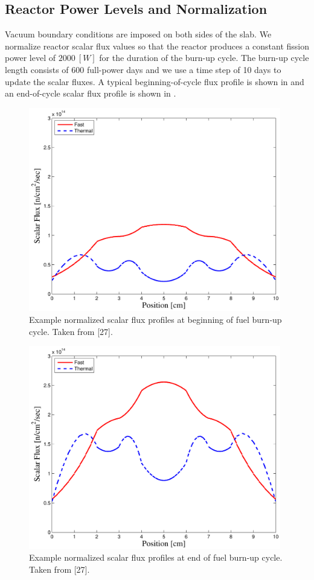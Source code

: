 \subsection{Reactor Power Levels and Normalization}

Vacuum boundary conditions are imposed on both sides of the slab.  
We normalize reactor scalar flux values so that the reactor produces a constant fission power level of $2000~[W]$ for the duration of the burn-up cycle.
The burn-up cycle length consists of 600 full-power days and we use a time step of 10 days to update the scalar fluxes.
A typical beginning-of-cycle flux profile is shown in  and an end-of-cycle scalar flux profile is shown in .  
\begin{figure}[!htp]
\centering
\includegraphics[width=11cm]{chapter5_depletion/P1_Lobatto_full_80_cells_t_steps60_End_600_Power_2000__BOC_Flux.pdf}
\caption{Example normalized scalar flux profiles at beginning of fuel burn-up cycle.  Taken from [27].}
\label{fig:ex_boc_cycle}
\end{figure}
%
\begin{figure}[!htp]
\centering
\includegraphics[width=11cm]{chapter5_depletion/P1_Lobatto_full_80_cells_t_steps60_End_600_Power_2000__EOC_Flux.pdf}
\caption{Example normalized scalar flux profiles at end of fuel burn-up cycle.  Taken from [27].}
\label{fig:ex_eoc_cycle}
\end{figure}

